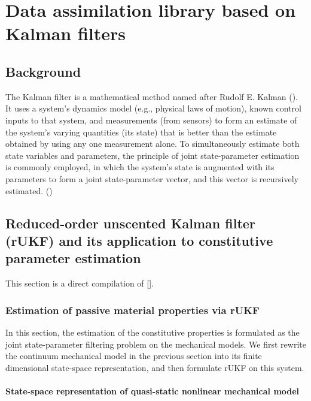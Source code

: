 \chapter{Data assimilation library based on Kalman filters}


\section{Background}
The Kalman filter is a mathematical method named after Rudolf E. Kalman (\citealt{Kalman1960New}). It uses a system's dynamics model (e.g., physical laws of motion), known control inputs to that system, and measurements (from sensors) to form an estimate of the system's varying quantities (its state) that is better than the estimate obtained by using any one measurement alone. To simultaneously estimate both state variables and parameters, the principle of joint state-parameter estimation is commonly employed, in which the system's state is augmented with its parameters to form a joint state-parameter vector, and this vector is recursively estimated. (\citealt{Chen2008Improved})

\section{Reduced-order unscented Kalman filter (rUKF) and its application to constitutive parameter estimation}
This section is a direct compilation of [\citealt{Xi2010Myocardial}].

\subsection{Estimation of passive material properties via rUKF}
\label{sec-estimator-equation}
In this section, the estimation of the constitutive properties is formulated as the joint state-parameter filtering problem on the mechanical models. We first rewrite the continuum mechanical model in the previous section into its finite dimensional state-space representation, and then formulate rUKF on this system.

\subsubsection{State-space representation of quasi-static nonlinear mechanical model}
\label{sec-state-space-representation-mech-model}

